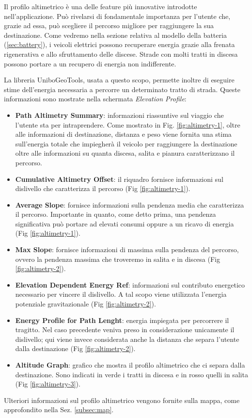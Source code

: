 Il profilo altimetrico è una delle feature più innovative introdotte nell'applicazione. Può rivelarsi di fondamentale importanza per l'utente che, grazie ad essa, può scegliere il percorso migliore per raggiungere la sua destinazione. Come vedremo nella sezione relativa al modello della batteria (\ref{sec:battery}), i veicoli elettrici possono recuperare energia grazie alla frenata rigenerativa e allo sfruttamento delle discese. Strade con molti tratti in discesa possono portare a un recupero di energia non indifferente. 

La libreria UniboGeoTools, usata a questo scopo, permette inoltre di eseguire stime dell'energia necessaria a percorre un determinato tratto di strada. Queste informazioni sono mostrate nella schermata \emph{Elevation Profile}:

\begin{itemize}
	\item \textbf{Path Altimetry Summary}: informazioni riassuntive sul viaggio che l'utente sta per intraprendere. Come mostrato in Fig. \ref{fig:altimetry-1}, oltre alle informazioni di destinazione, distanza e peso viene fornita una stima sull'energia totale che impiegherà il veicolo per raggiungere la destinazione oltre alle informazioni su quanta discesa, salita e pianura caratterizzano il percorso.
	\item \textbf{Cumulative Altimetry Offset}: il riquadro fornisce informazioni sul dislivello che caratterizza il percorso (Fig \ref{fig:altimetry-1}).
	\item \textbf{Average Slope}: fornisce informazioni sulla pendenza media che caratterizza il percorso. Importante in quanto, come detto prima, una pendenza significativa può portare ad elevati consumi oppure a un ricavo di energia (Fig \ref{fig:altimetry-1}).
	\item \textbf{Max Slope}: fornisce informazioni di massima sulla pendenza del percorso, ovvero la pendenza massima che troveremo in salita e in discesa (Fig \ref{fig:altimetry-2}).
	\item \textbf{Elevation Dependent Energy Ref}: informazioni sul contributo energetico necessario per vincere il dislivello. A tal scopo viene utilizzata l'energia potenziale gravitazionale (Fig \ref{fig:altimetry-2}).
	\item \textbf{Energy Profile for Path Lenght}: energia impiegata per percorrere il tragitto. Nel caso precedente veniva preso in considerazione unicamente il dislivello; qui viene invece considerata anche la distanza che separa l'utente dalla destinazione (Fig \ref{fig:altimetry-2}).
	\item \textbf{Altitude Graph}: grafico che mostra il profilo altimetrico che ci separa dalla destinazione. Sono indicati in verde i tratti in discesa e in rosso quelli in salita (Fig \ref{fig:altimetry-3}).
\end{itemize} 
\noindent
Ulteriori informazioni sul profilo altimetrico vengono fornite sulla mappa, come approfondito nella Sez. \ref{subsec:map}.

